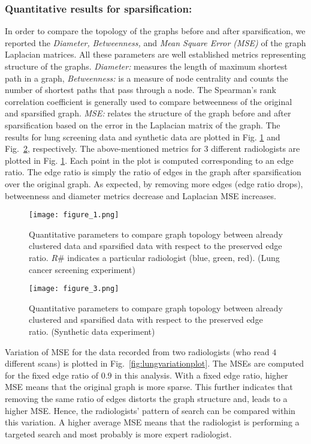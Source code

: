\documentclass[preprint,12pt]{elsarticle}
\begin{document}
\subsubsection{Quantitative results for sparsification:} In order to compare the topology of the graphs before and after sparsification, we reported the \textit{Diameter,} \textit{Betweenness,} and \textit{Mean Square Error (MSE)} of the graph Laplacian matrices. All these parameters are well established metrics representing structure of the graphs. \textit{Diameter:} measures the length of maximum shortest path in a graph, \textit{Betweenness:} is a measure of node centrality and counts the number of shortest paths that pass through a node. The Spearman's rank correlation coefficient is generally used to compare betweenness of the original and sparsified graph. \textit{MSE:} relates the structure of the graph before and after sparsification based on the error in the Laplacian matrix of the graph. The results for lung screening data and synthetic data are plotted in Fig. \ref{fig:lungplot} and Fig.~\ref{fig:syntheticplot}, respectively. The above-mentioned metrics for $3$ different radiologists are plotted in Fig. \ref{fig:lungplot}. Each point in the plot is computed corresponding to an edge ratio. The edge ratio is simply the ratio of edges in the graph after sparsification over the original graph. As expected, by removing more edges (edge ratio drops), betweenness and diameter metrics decrease and Laplacian MSE increases.

\begin{figure}[h]
\centering
\texttt{[image: figure\_1.png]}
\caption{Quantitative parameters to compare graph topology between already clustered data and sparsified  data with respect to the preserved edge ratio. $R\#$ indicates a particular radiologist (blue, green, red). (Lung cancer screening experiment)\label{fig:lungplot}}
\end{figure}

\begin{figure}[h]
\centering
\texttt{[image: figure\_3.png]}
\caption{Quantitative parameters to compare graph topology between already clustered and sparsified  data with respect to the preserved edge ratio. (Synthetic data experiment)\label{fig:syntheticplot}}
\end{figure}

Variation of MSE for the data recorded from two radiologists (who read $4$ different scans) is plotted in Fig.~\ref{fig:lungvariationplot}. The MSEs are computed for the fixed edge ratio of $0.9$ in this analysis. With a fixed edge ratio, higher MSE means that the original graph is more sparse. This further indicates that removing the same ratio of edges distorts the graph structure and, leads to a higher MSE. Hence, the radiologists' pattern of search can be compared within this variation. A higher average MSE means that the radiologist is performing a targeted search and most probably is more expert radiologist.
\end{document}
